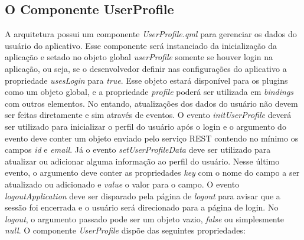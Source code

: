 \subsection{O Componente UserProfile}\label{sec:solucao-desenvolvida}
A arquitetura possui um componente \textit{UserProfile.qml} para gerenciar os dados do usuário do aplicativo. Esse componente será instanciado da inicialização da aplicação e setado no objeto global \textit{userProfile} somente se houver login na aplicação, ou seja, se o desenvolvedor definir nas configurações do aplicativo a propriedade \textit{usesLogin} para \textit{true}. Esse objeto estará disponível para os plugins como um objeto global, e a propriedade \textit{profile} poderá ser utilizada em \textit{bindings} com outros elementos. No entando, atualizações dos dados do usuário não devem ser feitas diretamente e sim através de eventos. O evento \textit{initUserProfile} deverá ser utilizado para inicializar o perfil do usuário após o login e o argumento do evento deve conter um objeto enviado pelo serviço REST contendo no mínimo os campos \textit{id} e \textit{email}. Já o evento \textit{setUserProfileData} deve ser utilizado para atualizar ou adicionar alguma informação ao perfil do usuário. Nesse último evento, o argumento deve conter as propriedades \textit{key} com o nome do campo a ser atualizado ou adicionado e \textit{value} o valor para o campo. O evento \textit{logoutApplication} deve ser disparado pela página de \textit{logout} para avisar que a sessão foi encerrada e o usuário será direcionado para a página de login. No \textit{logout}, o argumento passado pode ser um objeto vazio, \textit{false} ou simplesmente \textit{null}. O componente \textit{UserProfile} dispõe das seguintes propriedades:


